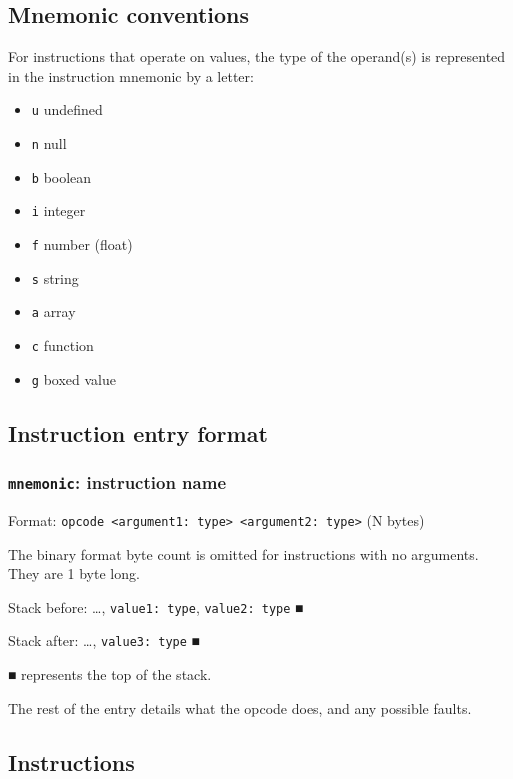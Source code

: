 \documentclass[11pt]{article}
\begin{document}
\subsection{Mnemonic conventions}
\label{sec:org6c2c333}
For instructions that operate on values, the type of the operand(s) is
represented in the instruction mnemonic by a letter:

\begin{itemize}
\item \texttt{u} undefined

\item \texttt{n} null

\item \texttt{b} boolean

\item \texttt{i} integer

\item \texttt{f} number (float)

\item \texttt{s} string

\item \texttt{a} array

\item \texttt{c} function

\item \texttt{g} boxed value
\end{itemize}

\subsection{Instruction entry format}
\label{sec:org6af44d0}
\subsubsection{\texttt{mnemonic}: instruction name}
\label{sec:org91c15ea}
Format: \texttt{opcode <argument1: type> <argument2: type>} (N bytes)

The binary format byte count is omitted for instructions with no
arguments. They are 1 byte long.

Stack before: \ldots{}​, \texttt{value1: type}, \texttt{value2: type} ■

Stack after: \ldots{}​, \texttt{value3: type} ■

■ represents the top of the stack.

The rest of the entry details what the opcode does, and any possible
faults.

\subsection{Instructions}
\label{sec:org33d7595}
\end{document}
